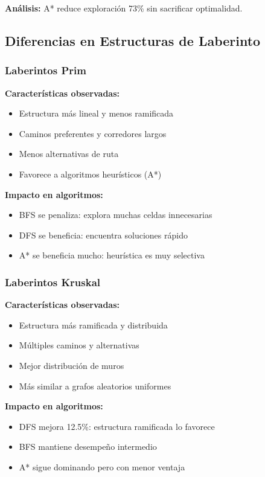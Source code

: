 \documentclass[12pt,a4paper]{article}
\begin{document}
\textbf{Análisis:} A* reduce exploración 73\% sin sacrificar optimalidad.

\subsection{Diferencias en Estructuras de Laberinto}

\subsubsection{Laberintos Prim}

\textbf{Características observadas:}
\begin{itemize}
    \item Estructura más lineal y menos ramificada
    \item Caminos preferentes y corredores largos
    \item Menos alternativas de ruta
    \item Favorece a algoritmos heurísticos (A*)
\end{itemize}

\textbf{Impacto en algoritmos:}
\begin{itemize}
    \item BFS se penaliza: explora muchas celdas innecesarias
    \item DFS se beneficia: encuentra soluciones rápido
    \item A* se beneficia mucho: heurística es muy selectiva
\end{itemize}

\subsubsection{Laberintos Kruskal}

\textbf{Características observadas:}
\begin{itemize}
    \item Estructura más ramificada y distribuida
    \item Múltiples caminos y alternativas
    \item Mejor distribución de muros
    \item Más similar a grafos aleatorios uniformes
\end{itemize}

\textbf{Impacto en algoritmos:}
\begin{itemize}
    \item DFS mejora 12.5\%: estructura ramificada lo favorece
    \item BFS mantiene desempeño intermedio
    \item A* sigue dominando pero con menor ventaja
\end{itemize}
\end{document}
